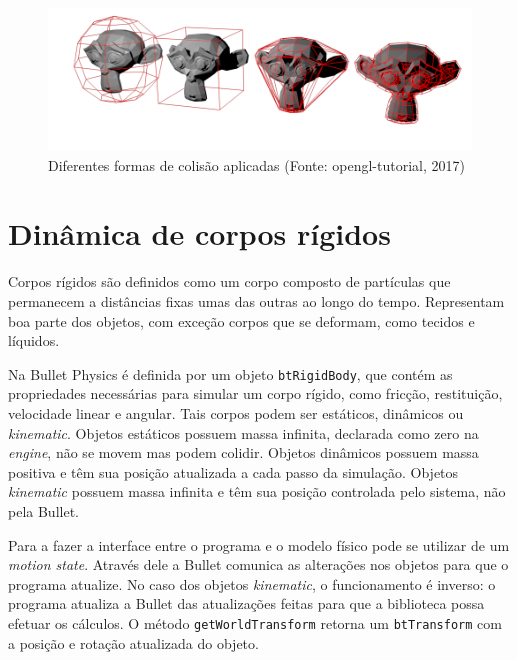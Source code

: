 \begin{figure}[H]
	\centering
	\includegraphics[scale=0.4]{imagens/collision-shapes.png}
	\caption{\small Diferentes formas de colisão aplicadas (Fonte: opengl-tutorial, 2017)}
	\label{fig:collisionshapes}
\end{figure}

\section{Dinâmica de corpos rígidos}
Corpos rígidos são definidos como um corpo composto de partículas que permanecem a distâncias fixas umas das outras ao longo do tempo. Representam boa parte dos objetos, com exceção corpos que se deformam, como tecidos e líquidos.

Na Bullet Physics é definida por um objeto \lstinline{btRigidBody}, que contém as propriedades necessárias para simular um corpo rígido, como fricção, restituição, velocidade linear e angular. Tais corpos podem ser estáticos, dinâmicos ou \textit{kinematic}. Objetos estáticos possuem massa infinita, declarada como zero na \textit{engine}, não se movem mas podem colidir. Objetos dinâmicos possuem massa positiva e têm sua posição atualizada a cada passo da simulação. Objetos \textit{kinematic} possuem massa infinita e têm sua posição controlada pelo sistema, não pela Bullet.

Para a fazer a interface entre o programa e o modelo físico pode se utilizar de um \textit{motion state}. Através dele a Bullet comunica as alterações nos objetos para que o programa atualize. No caso dos objetos \textit{kinematic}, o funcionamento é inverso: o programa atualiza a Bullet das atualizações feitas para que a biblioteca possa efetuar os cálculos. O método \lstinline{getWorldTransform} retorna um \lstinline{btTransform} com a posição e rotação atualizada do objeto.